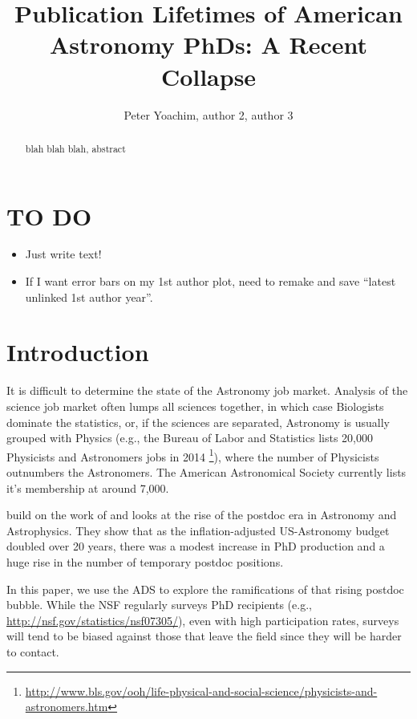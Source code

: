\documentclass{emulateapj}
\begin{document}
\title{Publication Lifetimes of American Astronomy PhDs: A Recent Collapse}

\author{Peter Yoachim, author 2, author 3 
  }


\begin{abstract}
blah blah blah, abstract

\end{abstract}


\section{TO DO}
\begin{itemize}
\item{Just write text! }
  \item{If I want error bars on my 1st author plot, need to remake and save ``latest unlinked 1st author year''.}
\end{itemize}

\section{Introduction}

It is difficult to determine the state of the Astronomy job market.  Analysis of the science job market often lumps all sciences together, in which case Biologists dominate the statistics, or, if the sciences are separated, Astronomy is usually grouped with Physics (e.g., the Bureau of Labor and Statistics lists 20,000 Physicists and Astronomers jobs in 2014 \footnote{\url{http://www.bls.gov/ooh/life-physical-and-social-science/physicists-and-astronomers.htm}}), where the number of Physicists outnumbers the Astronomers.  The American Astronomical Society currently lists it's membership at around 7,000.

\citet{Seth09} build on the work of \citet{Metcalfe08} and looks at the rise of the postdoc era in Astronomy and Astrophysics.  They show that as the inflation-adjusted US-Astronomy budget doubled over 20 years, there was a modest increase in PhD production and a huge rise in the number of temporary postdoc positions.

In this paper, we use the ADS to explore the ramifications of that rising postdoc bubble.  While the NSF regularly surveys PhD recipients (e.g., \url{http://nsf.gov/statistics/nsf07305/}), even with high participation rates, surveys will tend to be biased against those that leave the field since they will be harder to contact.
\end{document}
